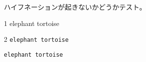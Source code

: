 \documentclass{article}
\begin{document}
ハイフネーションが起きないかどうかテスト。

1 elephant tortoise

2 \verb|elephant tortoise|

\verb|elephant tortoise|
\end{document}
